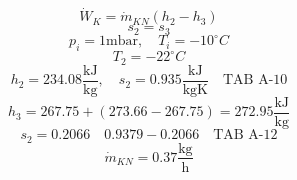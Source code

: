

\item[(b)] 
    \[
    \dot{W}_K = \dot{m}_{KN} (h_2 - h_3)
    \]
    \[
    s_2 = s_3
    \]
    \[
    p_i = 1 \text{mbar}, \quad T_i = -10^\circ C
    \]
    \[
    T_2 = -22^\circ C
    \]
    \[
    h_2 = 234.08 \frac{\text{kJ}}{\text{kg}}, \quad s_2 = 0.935 \frac{\text{kJ}}{\text{kgK}} \quad \text{TAB A-10}
    \]
    \[
    h_3 = 267.75 + (273.66 - 267.75) = 272.95 \frac{\text{kJ}}{\text{kg}}
    \]
    \[
    s_2 = 0.2066 \quad 0.9379 - 0.2066 \quad \text{TAB A-12}
    \]
    \[
    \dot{m}_{KN} = 0.37 \frac{\text{kg}}{\text{h}}
    \]